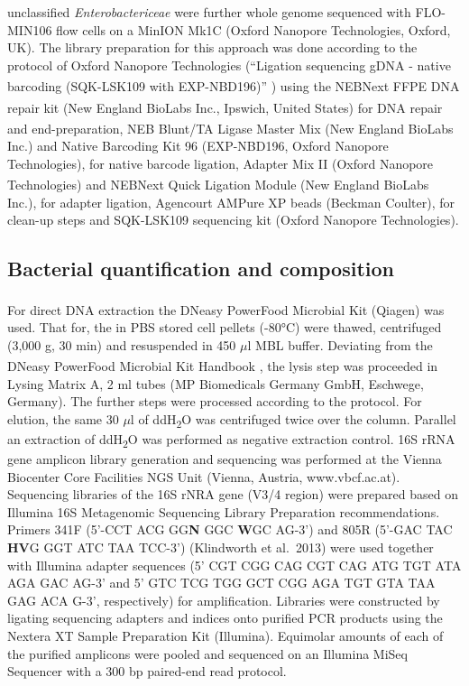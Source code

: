 \documentclass[preprint, 3p,
authoryear]{elsarticle} %
\begin{document}
unclassified \emph{Enterobactericeae} were further whole genome
sequenced with FLO-MIN106 flow cells on a MinION Mk1C (Oxford Nanopore
Technologies, Oxford, UK). The library preparation for this approach was
done according to the protocol of Oxford Nanopore Technologies
(``Ligation sequencing gDNA - native barcoding (SQK-LSK109 with
EXP-NBD196)'' \citep{OxfordNanoporeTechnologies.2021}) using the
NEBNext\textsuperscript{\textregistered} FFPE DNA repair kit (New
England BioLabs\textsuperscript{\textregistered} Inc., Ipswich, United
States) for DNA repair and end-preparation, NEB Blunt/TA Ligase Master
Mix (New England BioLabs\textsuperscript{\textregistered} Inc.) and
Native Barcoding Kit 96 (EXP-NBD196, Oxford Nanopore Technologies), for
native barcode ligation, Adapter Mix II (Oxford Nanopore Technologies)
and NEBNext\textsuperscript{\textregistered} Quick Ligation Module (New
England BioLabs\textsuperscript{\textregistered} Inc.), for adapter
ligation, Agencourt AMPure XP beads (Beckman Coulter\texttrademark), for
clean-up steps and SQK-LSK109 sequencing kit (Oxford Nanopore
Technologies).

\hypertarget{bacterial-quantification-and-composition}{%
\subsection{Bacterial quantification and
composition}\label{bacterial-quantification-and-composition}}

For direct DNA extraction the DNeasy\textsuperscript{\textregistered}
PowerFood\textsuperscript{\textregistered} Microbial Kit (Qiagen) was
used. That for, the in PBS stored cell pellets (-80°C) were thawed,
centrifuged (3,000 g, 30 min) and resuspended in 450 \(\mu\)l MBL
buffer. Deviating from the DNeasy\textsuperscript{\textregistered}
PowerFood\textsuperscript{\textregistered} Microbial Kit Handbook
\citep{Qiagen.2017}, the lysis step was proceeded in Lysing Matrix A, 2
ml tubes (MP Biomedicals Germany GmbH, Eschwege, Germany). The further
steps were processed according to the protocol. For elution, the same 30
\(\mu\)l of ddH\textsubscript{2}O was centrifuged twice over the column.
Parallel an extraction of ddH\textsubscript{2}O was performed as
negative extraction control. 16S rRNA gene amplicon library generation
and sequencing was performed at the Vienna Biocenter Core Facilities NGS
Unit (Vienna, Austria, www.vbcf.ac.at). Sequencing libraries of the 16S
rNRA gene (V3/4 region) were prepared based on Illumina 16S Metagenomic
Sequencing Library Preparation recommendations. Primers 341F (5'-CCT ACG
GG\textbf{N} GGC \textbf{W}GC AG-3') and 805R (5'-GAC TAC \textbf{HV}G
GGT ATC TAA TCC-3') (Klindworth et al.~2013) were used together with
Illumina adapter sequences (5' CGT CGG CAG CGT CAG ATG TGT ATA AGA GAC
AG-3' and 5' GTC TCG TGG GCT CGG AGA TGT GTA TAA GAG ACA G-3',
respectively) for amplification. Libraries were constructed by ligating
sequencing adapters and indices onto purified PCR products using the
Nextera XT Sample Preparation Kit (Illumina). Equimolar amounts of each
of the purified amplicons were pooled and sequenced on an Illumina MiSeq
Sequencer with a 300 bp paired-end read protocol.
\end{document}
